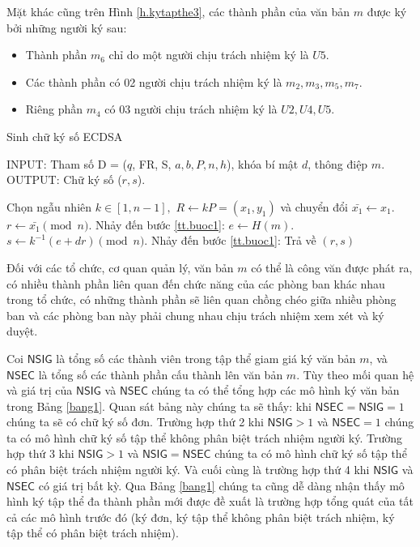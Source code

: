 Mặt khác cũng trên Hình \ref{h.kytapthe3}, các thành phần của văn bản $m$ được ký bởi những người ký sau:
\begin{itemize}
	\item Thành phần $m_6$ chỉ do một người chịu trách nhiệm ký là $U5$.
	\item Các thành phần có 02 người chịu trách nhiệm ký là $m_2,m_3,m_5,m_7$.
	\item Riêng phần $m_4$ có 03 người chịu trách nhiệm ký là $U2,U4,U5$.
\end{itemize}

\begin{algorithm}%
	\caption{Sinh chữ ký số ECDSA}
	INPUT: Tham số D = ($q$, FR, S, $a, b, P, n, h$), khóa bí mật $d$, thông điệp $m$. \\
	OUTPUT: Chữ ký số ($r, s$).
	\label{label1}
	\begin{algorithmic}[1]
		\STATE Chọn ngẫu nhiên $k \in [1, n-1],$ \label{tt.buoc1}
		\STATE  $R \gets kP=(x_1,y_1)$ và chuyển đổi $\bar{x_1}\gets x_1 $.
		\STATE  $r\gets\bar{x_1} \pmod n$.  
		\STATE Nhảy đến bước \ref{tt.buoc1}: 
		\ENDIF
		\STATE $e\gets H(m)$.
		\STATE $s \gets k^{-1}(e+dr) \pmod n$. 
		\STATE Nhảy đến bước \ref{tt.buoc1}: 
		\ENDIF
		\STATE Trả về $(r,s)$
	\end{algorithmic}
\end{algorithm}


Đối với các tổ chức, cơ quan quản lý, văn bản $m$ có thể là công văn được phát ra, có nhiều thành phần liên quan đến chức năng của các phòng ban khác nhau trong tổ chức, có những thành phần sẽ liên quan chồng chéo giữa nhiều phòng ban và các phòng ban này phải chung nhau chịu trách nhiệm xem xét và ký duyệt.

Coi $\mathsf{NSIG}$ là tổng số các thành viên trong tập thể giam giá ký văn bản $m$, và $\mathsf{NSEC}$ là tổng số các thành phần cấu thành lên văn bản $m$. Tùy theo mối quan hệ và giá trị của $\mathsf{NSIG}$ và $\mathsf{NSEC}$ chúng ta có thể tổng hợp các mô hình ký văn bản trong Bảng \ref{bang1}. Quan sát bảng này chúng ta sẽ thấy: khi $\mathsf{NSEC}=\mathsf{NSIG}=1$ chúng ta sẽ có chữ ký số đơn. Trường hợp thứ 2 khi $\mathsf{NSIG}>1$ và $\mathsf{NSEC}=1$ chúng ta có mô hình chữ ký số tập thể không phân biệt trách nhiệm người ký. Trường hợp thứ 3 khi  $\mathsf{NSIG}>1$ và $\mathsf{NSIG}=\mathsf{NSEC}$ chúng ta có mô hình chữ ký số tập thể có phân biệt trách nhiệm người ký. Và cuối cùng là trường hợp thứ 4 khi $\mathsf{NSIG}$ và $\mathsf{NSEC}$ có giá trị bất kỳ. Qua Bảng \ref{bang1} chúng ta cũng dễ dàng nhận thấy mô hình ký tập thể đa thành phần mới được đề xuất là trường hợp tổng quát của tất cả các mô hình trước đó (ký đơn, ký tập thể không phân biệt trách nhiệm, ký tập thể có phân biệt trách nhiệm).

